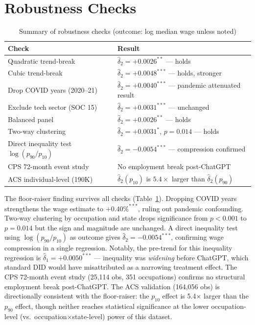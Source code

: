 \documentclass[12pt,a4paper]{article}
\begin{document}
\section{Robustness Checks}

\begin{table}[H]
\centering
\caption{Summary of robustness checks (outcome: log median wage unless noted)}
\label{tab:robust}
\small
\begin{tabular}{p{5.8cm}p{6.5cm}}
\toprule
\textbf{Check} & \textbf{Result} \\
\midrule
Quadratic trend-break        & $\hat\delta_2=+0.0026^{**}$ — holds \\
Cubic trend-break            & $\hat\delta_2=+0.0048^{***}$ — holds, stronger \\
Drop COVID years (2020--21)  & $\hat\delta_2=+0.0040^{***}$ — pandemic attenuated result \\
Exclude tech sector (SOC 15) & $\hat\delta_2=+0.0031^{***}$ — unchanged \\
Balanced panel               & $\hat\delta_2=+0.0026^{**}$ — holds \\
Two-way clustering           & $\hat\delta_2=+0.0031^{*}$, $p=0.014$ — holds \\
Direct inequality test $\log(p_{90}/p_{10})$ & $\hat\delta_2=-0.0054^{***}$ — compression confirmed \\
CPS 72-month event study     & No employment break post-ChatGPT \\
ACS individual-level (190K)  & $\hat\delta_2(p_{10})$ is $5.4\times$ larger than $\hat\delta_2(p_{90})$ \\
\bottomrule
\end{tabular}
\end{table}

The floor-raiser finding survives all checks (Table~\ref{tab:robust}). Dropping COVID years strengthens the wage estimate to $+0.40\%^{***}$, ruling out pandemic confounding. Two-way clustering by occupation and state drops significance from $p<0.001$ to $p=0.014$ but the sign and magnitude are unchanged. A direct inequality test using $\log(p_{90}/p_{10})$ as outcome gives $\hat\delta_2=-0.0054^{***}$, confirming wage compression in a single regression. Notably, the pre-trend for this inequality regression is $\hat\delta_1=+0.0050^{***}$ — inequality was \emph{widening} before ChatGPT, which standard DID would have misattributed as a narrowing treatment effect. The CPS 72-month event study (25,114 obs, 351 occupations) confirms no structural employment break post-ChatGPT. The ACS validation (164,056 obs) is directionally consistent with the floor-raiser: the $p_{10}$ effect is 5.4$\times$ larger than the $p_{90}$ effect, though neither reaches statistical significance at the lower occupation-level (vs.\ occupation$\times$state-level) power of this dataset.
\end{document}
